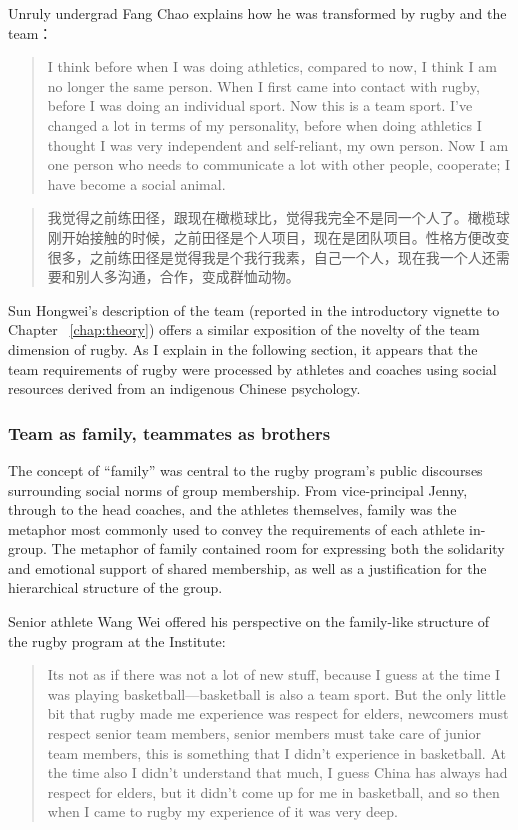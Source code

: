 \begin{CJK}{UTF8}{gbsn}
  Unruly undergrad Fang Chao explains how he was transformed by rugby and the team：

      \begin{quotation}
        I think before when I was doing athletics, compared to now, I think I am no longer the same person.  When I first came into contact with rugby, before I was doing an individual sport.  Now this is a team sport. I've changed a lot in terms of my personality, before when doing athletics I thought I was very independent and self-reliant, my own person.  Now I am one person who needs to communicate a lot with other people, cooperate; I have become a social animal.
      \end{quotation}

      \begin{quotation}
        我觉得之前练田径，跟现在橄榄球比，觉得我完全不是同一个人了。橄榄球刚开始接触的时候，之前田径是个人项目，现在是团队项目。性格方便改变很多，之前练田径是觉得我是个我行我素，自己一个人，现在我一个人还需要和别人多沟通，合作，变成群恤动物。
      \end{quotation}

Sun Hongwei's description of the team (reported in the introductory vignette to Chapter ~\ref{chap:theory}) offers a similar exposition of the novelty of the team dimension of rugby. As I explain in the following section, it appears that the team requirements of rugby were processed by athletes and coaches using social resources derived from an indigenous Chinese psychology.


\subsubsection{Team as family, teammates as brothers}
The concept of ``family'' was central to the rugby program's public discourses surrounding social norms of group membership.  From vice-principal Jenny, through to the head coaches, and the athletes themselves, family was the metaphor most commonly used to convey the requirements of each athlete in-group.  The metaphor of family contained room for expressing both the solidarity and emotional support of shared membership, as well as a justification for the hierarchical structure of the group.

Senior athlete Wang Wei offered his perspective on the family-like structure of the rugby program at the Institute:

  \begin{quotation}
    Its not as if there was not a lot of new stuff, because I guess at the time I was playing basketball---basketball is also a team sport.  But the only little bit that rugby made me experience was respect for elders, newcomers must respect senior team members, senior members must take care of junior team members, this is something that I didn’t experience in basketball.  At the time also I didn’t understand that much, I guess China has always had respect for elders, but it didn’t come up for me in basketball, and so then when I came to rugby my experience of it was very deep.
  \end{quotation}


\end{CJK}
